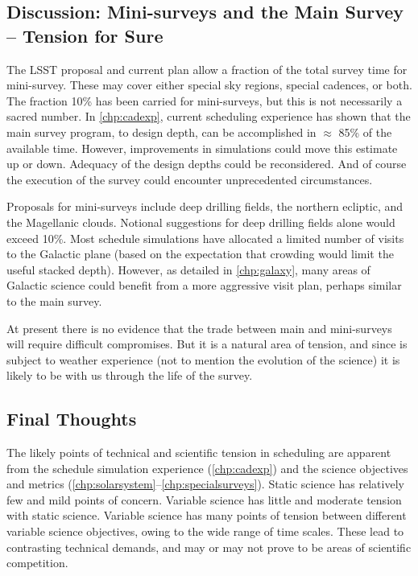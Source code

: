 
\subsection{Discussion: Mini-surveys and the Main Survey -- Tension for Sure}

The LSST proposal and current plan allow a fraction of the total survey
time for mini-survey. These may cover either special sky regions,
special cadences, or both. The fraction 10\% has been carried for
mini-surveys, but this is not necessarily a sacred number. In
\autoref{chp:cadexp}, current scheduling experience has shown that the
main survey program, to design depth, can be accomplished in $\approx$
85\% of the available time. However, improvements in simulations could
move this estimate up or down. Adequacy of the design depths could be
reconsidered.  And of course the execution of the survey could encounter
unprecedented circumstances.

Proposals for mini-surveys include deep drilling fields, the northern
ecliptic, and the Magellanic clouds. Notional suggestions for deep
drilling fields alone would exceed 10\%.   Most schedule simulations
have allocated a limited number of visits to the Galactic plane (based
on the expectation that crowding would limit the useful stacked depth).
However, as detailed in \autoref{chp:galaxy}, many areas of Galactic
science could benefit from a more aggressive visit plan, perhaps similar
to the main survey.

At present there is no evidence that the trade between main and
mini-surveys will require difficult compromises.  But it is a natural
area of tension, and since is subject to weather experience (not to
mention the evolution of the science) it is likely to be with us through
the life of the survey.


\subsection{Final Thoughts}

The likely points of technical and scientific tension in scheduling are
apparent from the schedule simulation experience (\autoref{chp:cadexp})
and the science objectives and metrics
(\autoref{chp:solarsystem}--\autoref{chp:specialsurveys}).  Static
science has relatively few and mild points of concern.  Variable science
has little and moderate tension with static science.  Variable science
has many points of tension between different variable science
objectives, owing to the wide range of time scales. These lead to
contrasting technical demands, and may or may not prove to be areas of
scientific competition.

